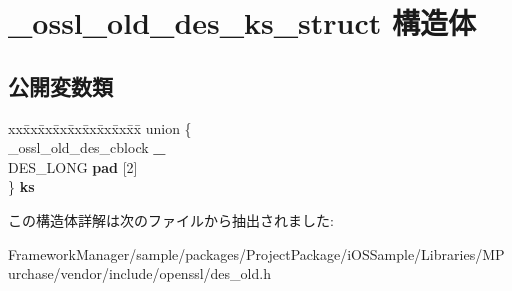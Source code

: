 \hypertarget{struct__ossl__old__des__ks__struct}{}\section{\+\_\+ossl\+\_\+old\+\_\+des\+\_\+ks\+\_\+struct 構造体}
\label{struct__ossl__old__des__ks__struct}
\subsection*{公開変数類}
\begin{DoxyCompactItemize}
\item 
\hypertarget{struct__ossl__old__des__ks__struct_abe4c8d1f287807f5379c1eb4404f4c81}{}\begin{tabbing}
xx\=xx\=xx\=xx\=xx\=xx\=xx\=xx\=xx\=\kill
union \{\\
\>\_ossl\_old\_des\_cblock {\bfseries \_}\\
\>DES\_LONG {\bfseries pad} \mbox{[}2\mbox{]}\\
\} {\bfseries ks}\label{struct__ossl__old__des__ks__struct_abe4c8d1f287807f5379c1eb4404f4c81}
\\

\end{tabbing}\end{DoxyCompactItemize}


この構造体詳解は次のファイルから抽出されました\+:\begin{DoxyCompactItemize}
\item 
Framework\+Manager/sample/packages/\+Project\+Package/i\+O\+S\+Sample/\+Libraries/\+M\+Purchase/vendor/include/openssl/des\+\_\+old.\+h\end{DoxyCompactItemize}
